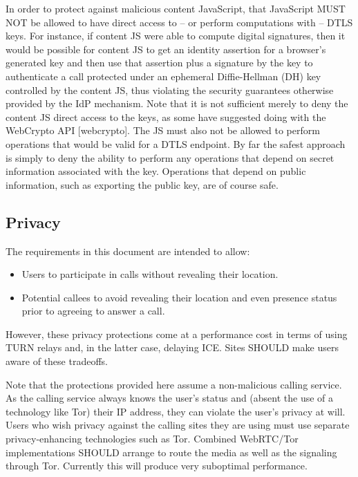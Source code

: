 \documentclass{article}
\begin{document}
In order to protect against malicious content JavaScript, that
JavaScript MUST NOT be allowed to have direct access to -- or perform
computations with -- DTLS keys.  For instance, if content JS were
able to compute digital signatures, then it would be possible for
content JS to get an identity assertion for a browser's generated key
and then use that assertion plus a signature by the key to
authenticate a call protected under an ephemeral Diffie-Hellman (DH)
key controlled by the content JS, thus violating the security
guarantees otherwise provided by the IdP mechanism.  Note that it is
not sufficient merely to deny the content JS direct access to the
keys, as some have suggested doing with the WebCrypto API
[webcrypto].  The JS must also not be allowed to perform operations
that would be valid for a DTLS endpoint.  By far the safest approach
is simply to deny the ability to perform any operations that depend
on secret information associated with the key.  Operations that
depend on public information, such as exporting the public key, are
of course safe.

\subsection{Privacy}

The requirements in this document are intended to allow:

\begin{itemize}
\item Users to participate in calls without revealing their location.

\item Potential callees to avoid revealing their location and even
  presence status prior to agreeing to answer a call.
\end{itemize}

However, these privacy protections come at a performance cost in
terms of using TURN relays and, in the latter case, delaying ICE.
Sites SHOULD make users aware of these tradeoffs.

Note that the protections provided here assume a non-malicious
calling service.  As the calling service always knows the user's
status and (absent the use of a technology like Tor) their IP
address, they can violate the user's privacy at will.  Users who wish
privacy against the calling sites they are using must use separate
privacy-enhancing technologies such as Tor. Combined WebRTC/Tor
implementations SHOULD arrange to route the media as well as the
signaling through Tor. Currently this will produce very suboptimal
performance.
\end{document}
